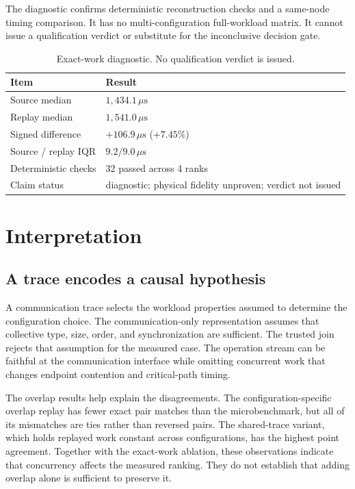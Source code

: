 \documentclass[10pt,twocolumn]{article}
\newcommand{\us}{\,\mu\mathrm{s}}
\begin{document}
The diagnostic confirms deterministic reconstruction checks and a same-node
timing comparison. It has no multi-configuration full-workload matrix. It
cannot issue a qualification verdict or substitute for the inconclusive
decision gate.

\begin{table}[t]
\caption{Exact-work diagnostic. No qualification verdict is issued.}
\label{tab:diagnostic}
\centering\small
\begin{tabularx}{\columnwidth}{@{}lY@{}}
\toprule
Item & Result \\
\midrule
Source median & $1{,}434.1\us$ \\
Replay median & $1{,}541.0\us$ \\
Signed difference & $+106.9\us$ ($+7.45\%$) \\
Source / replay IQR & $9.2 / 9.0\us$ \\
Deterministic checks & 32 passed across 4 ranks \\
Claim status & diagnostic; physical fidelity unproven; verdict not issued \\
\bottomrule
\end{tabularx}
\end{table}

\section{Interpretation}

\subsection{A trace encodes a causal hypothesis}

A communication trace selects the workload properties assumed to determine
the configuration choice. The communication-only representation assumes that
collective type, size, order, and synchronization are sufficient. The trusted
join rejects that assumption for the measured case. The operation stream can
be faithful at the communication interface while omitting concurrent work that
changes endpoint contention and critical-path timing.

The overlap results help explain the disagreements. The configuration-specific
overlap replay has fewer exact pair matches than the microbenchmark, but all
of its mismatches are ties rather than reversed pairs. The shared-trace variant,
which holds replayed work constant across configurations, has the highest
point agreement. Together with the exact-work ablation, these observations
indicate that concurrency affects the measured ranking. They do not establish
that adding overlap alone is sufficient to preserve it.
\end{document}
